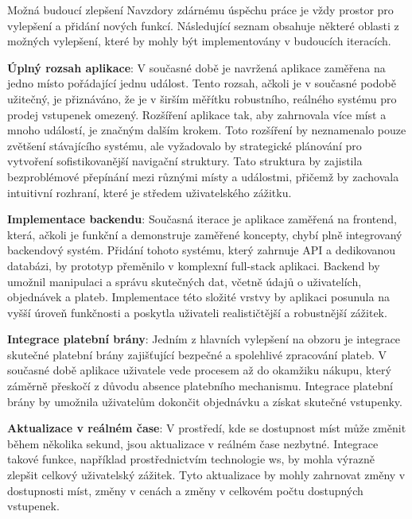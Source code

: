 \begin{section}{Možná budoucí zlepšení}
    \label{sec:zaver-budoucnost}
    Navzdory zdárnému úspěchu práce je vždy prostor pro vylepšení a přidání nových funkcí.
    Následující seznam obsahuje některé oblasti z možných vylepšení, které by mohly být implementovány v budoucích iteracích.

    \textbf{Úplný rozsah aplikace}: V současné době je navržená aplikace zaměřena na jedno místo pořádající jednu událost.
    Tento rozsah, ačkoli je v současné podobě užitečný, je přiznáváno, že je v širším měřítku robustního, reálného systému pro prodej vstupenek omezený.
    Rozšíření aplikace tak, aby zahrnovala více míst a mnoho událostí, je značným dalším krokem.
    Toto rozšíření by neznamenalo pouze zvětšení stávajícího systému, ale vyžadovalo by strategické plánování pro vytvoření sofistikovanější navigační struktury.
    Tato struktura by zajistila bezproblémové přepínání mezi různými místy a událostmi, přičemž by zachovala intuitivní rozhraní, které je středem uživatelského zážitku.

    \textbf{Implementace backendu}: Současná iterace je aplikace zaměřená na frontend, která, ačkoli je funkční a demonstruje zaměřené koncepty, chybí plně integrovaný backendový systém.
    Přidání tohoto systému, který zahrnuje API a dedikovanou databázi, by prototyp přeměnilo v komplexní full-stack aplikaci.
    Backend by umožnil manipulaci a správu skutečných dat, včetně údajů o uživatelích, objednávek a plateb.
    Implementace této složité vrstvy by aplikaci posunula na vyšší úroveň funkčnosti a poskytla uživateli realističtější a robustnější zážitek.

    \textbf{Integrace platební brány}: Jedním z hlavních vylepšení na obzoru je integrace skutečné platební brány zajišťující bezpečné a spolehlivé zpracování plateb.
    V současné době aplikace uživatele vede procesem až do okamžiku nákupu, který záměrně přeskočí z důvodu absence platebního mechanismu.
    Integrace platební brány by umožnila uživatelům dokončit objednávku a získat skutečné vstupenky.

    \textbf{Aktualizace v reálném čase}: V prostředí, kde se dostupnost míst může změnit během několika sekund, jsou aktualizace v reálném čase nezbytné.
    Integrace takové funkce, například prostřednictvím technologie \ac{ws}, by mohla výrazně zlepšit celkový uživatelský zážitek.
    Tyto aktualizace by mohly zahrnovat změny v dostupnosti míst, změny v cenách a změny v celkovém počtu dostupných vstupenek.


\end{section}

